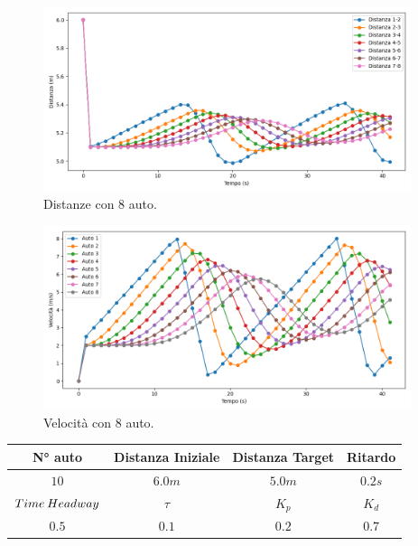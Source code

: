 \begin{figure}[H]
    \includegraphics[width=0.96\textwidth]{images/5-experiment/car-number/distance_8.png}
    \caption{Distanze con 8 auto.}
    \label{fig:8-cars-distance}
\end{figure}

\begin{figure}[H]
    \includegraphics[width=0.96\textwidth]{images/5-experiment/car-number/velocity_8.png}
    \caption{Velocità con 8 auto.}
    \label{fig:8-cars-velocity}
\end{figure}
\vspace*{\fill}
\newpage
\vspace*{\fill}
\begin{table}[h]
    \centering
    \begin{tabular}{|c|c|c|c|}
        \hline
        N° auto & Distanza Iniziale & Distanza Target & Ritardo \\
        \hline
        $10$ & $6.0 m$ & $5.0 m$ & $0.2 s$ \\
        \hline
        $Time\hspace{0.2em}Headway$ & $\tau$ & $K_p$ & $K_d$  \\
        \hline
        $0.5$ & $0.1$ & $0.2$ & $0.7$ \\
        \hline
    \end{tabular}
\end{table}

